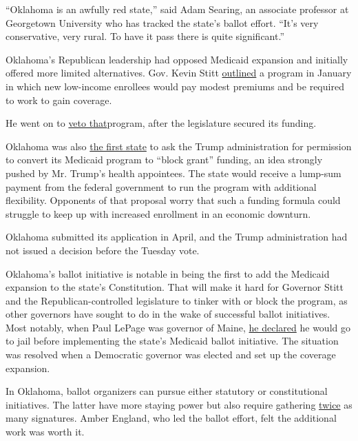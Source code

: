 ``Oklahoma is an awfully red state,'' said Adam Searing, an associate
professor at Georgetown University who has tracked the state's ballot
effort. ``It's very conservative, very rural. To have it pass there is
quite significant.''

Oklahoma's Republican leadership had opposed Medicaid expansion and
initially offered more limited alternatives. Gov. Kevin Stitt
\href{https://oklahoman.com/article/5653672/stitt-trump-administration-officials-unveil-medicaid-block-grant-plan}{outlined}
a program in January in which new low-income enrollees would pay modest
premiums and be required to work to gain coverage.

He went on to
\href{https://www.usnews.com/news/best-states/oklahoma/articles/2020-05-21/oklahoma-governor-vetoes-bill-to-fund-his-medicaid-plan}{veto
that}program, after the legislature secured its funding.

Oklahoma was also
\href{https://www.healthcaredive.com/news/oklahoma-1st-to-seek-waiver-to-block-grant-medicaid-despite-pandemic/576460/}{the
first state} to ask the Trump administration for permission to convert
its Medicaid program to ``block grant'' funding, an idea strongly pushed
by Mr. Trump's health appointees. The state would receive a lump-sum
payment from the federal government to run the program with additional
flexibility. Opponents of that proposal worry that such a funding
formula could struggle to keep up with increased enrollment in an
economic downturn.

Oklahoma submitted its application in April, and the Trump
administration had not issued a decision before the Tuesday vote.

Oklahoma's ballot initiative is notable in being the first to add the
Medicaid expansion to the state's Constitution. That will make it hard
for Governor Stitt and the Republican-controlled legislature to tinker
with or block the program, as other governors have sought to do in the
wake of successful ballot initiatives. Most notably, when Paul LePage
was governor of Maine,
\href{https://www.pressherald.com/2018/07/12/paul-lepage-says-hed-go-to-jail-before-he-expands-medicaid/}{he
declared} he would go to jail before implementing the state's Medicaid
ballot initiative. The situation was resolved when a Democratic governor
was elected and set up the coverage expansion.

In Oklahoma, ballot organizers can pursue either statutory or
constitutional initiatives. The latter have more staying power but also
require gathering
\href{https://ballotpedia.org/Laws_governing_the_initiative_process_in_Oklahoma}{twice}
as many signatures. Amber England, who led the ballot effort, felt the
additional work was worth it.

